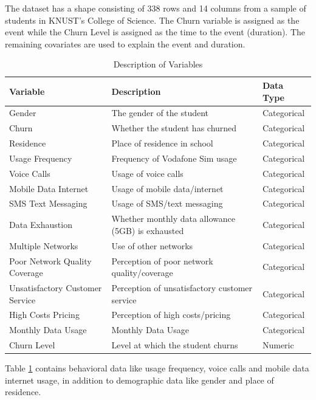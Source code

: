 \documentclass[doublespacing,12pt]{report}
\begin{document}
The dataset has a shape consisting of 338 rows and 14 columns from a sample of students in KNUST's College of Science. The Churn variable is assigned as the event while the Churn Level is assigned as the time to the event (duration). The remaining covariates are used to explain the event and duration.
\begin{table}[H]
    \centering
    \begin{tabularx}{\textwidth}{XXl}
        \toprule
        \textbf{Variable} & \textbf{Description} & \textbf{Data Type} \\
        \midrule
        Gender & The gender of the student & Categorical \\
        Churn & Whether the student has churned & Categorical \\
        Residence & Place of residence in school & Categorical \\
        Usage Frequency & Frequency of Vodafone Sim usage & Categorical \\
        Voice Calls & Usage of voice calls & Categorical \\
        Mobile Data Internet & Usage of mobile data/internet & Categorical \\
        SMS Text Messaging & Usage of SMS/text messaging & Categorical \\
        Data Exhaustion & Whether monthly data allowance (5GB) is exhausted & Categorical \\
        Multiple Networks & Use of other networks &Categorical \\
        Poor Network Quality Coverage & Perception of poor network quality/coverage & Categorical \\
        Unsatisfactory Customer Service & Perception of unsatisfactory customer service & Categorical \\
        High Costs Pricing & Perception of high costs/pricing & Categorical \\
        Monthly Data Usage & Monthly Data Usage & Categorical \\
        Churn Level & Level at which the student churns & Numeric \\
        \bottomrule
    \end{tabularx}
    \caption{Description of Variables}
    \label{tab: 4.1}
\end{table}
\noindent Table \ref{tab: 4.1} contains behavioral data like usage frequency, voice calls and mobile data internet usage, in addition to demographic data like gender and place of residence.
\end{document}
